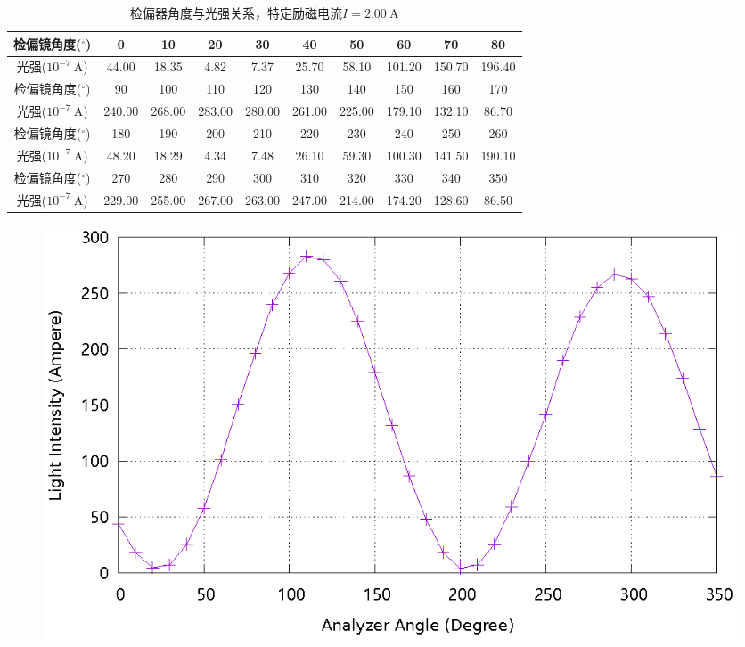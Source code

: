 \documentclass{ctexart}
\newcommand{\si}[1]{\  \mathrm{#1}}
\begin{document}
\newpage
\begin{table}[H]
    \centering
    \begin{tabular}{|c|c|c|c|c|c|c|c|c|c|}
        \hline
        检偏镜角度(${}^{\circ}$)  & 0   & 10  & 20  & 30  & 40  & 50  & 60  & 70  & 80  \\\hline
        光强($10^{-7} \si{A}$) & 44.00 & 18.35 & 4.82 & 7.37 & 25.70 & 58.10 & 101.20 & 150.70 & 196.40 \\\hline
        检偏镜角度(${}^{\circ}$)  & 90  & 100 & 110 & 120 & 130 & 140 & 150 & 160 & 170 \\\hline
        光强($10^{-7} \si{A}$) & 240.00 & 268.00 & 283.00 & 280.00 & 261.00 & 225.00 & 179.10 & 132.10 & 86.70 \\\hline
        检偏镜角度(${}^{\circ}$)  & 180 & 190 & 200 & 210 & 220 & 230 & 240 & 250 & 260 \\\hline
        光强($10^{-7} \si{A}$) & 48.20 & 18.29 & 4.34 & 7.48 & 26.10 & 59.30 & 100.30 & 141.50 & 190.10 \\\hline
        检偏镜角度(${}^{\circ}$)  & 270 & 280 & 290 & 300 & 310 & 320 & 330 & 340 & 350 \\\hline
        光强($10^{-7} \si{A}$) & 229.00 & 255.00 & 267.00 & 263.00 & 247.00 & 214.00 & 174.20 & 128.60 & 86.50 \\\hline
    \end{tabular}
    \caption{检偏器角度与光强关系，特定励磁电流$I=2.00 \si{A}$}
\end{table}
\begin{figure}[H]
    \centering
    \includegraphics[width=0.9\linewidth]{../output/analyzer-angle-light-intensity-3.gnuplot}
\end{figure}
\newpage
\end{document}
